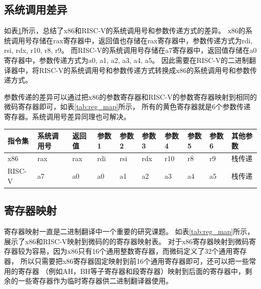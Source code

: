 \subsection{系统调用差异}

如表\ref{tab:syscall}所示，总结了x86和RISC-V的系统调用号和参数传递方式的差异。
x86的系统调用号存储在rax寄存器中，返回值也存储在rax寄存器中，参数传递方式为rdi, rsi, rdx, r10, r8, r9。
而RISC-V的系统调用号存储在a7寄存器中，返回值存储在a0寄存器中，参数传递方式为a0, a1, a2, a3, a4, a5。
因此需要在RISC-V的二进制翻译器中，将RISC-V的系统调用号和参数传递方式转换成x86的系统调用号和参数传递方式。

参数传递的差异可以通过把x86的参数寄存器和RISC-V的参数寄存器映射到相同的微码寄存器即可，如表\ref{tab:reg_map}所示，
所有的黄色寄存器就是6个参数传递寄存器。系统调用号差异同理也可解决。



\begin{table}[h]
    \centering
    \footnotesize%
    \setlength{\tabcolsep}{4pt}%
    \renewcommand{\arraystretch}{1.2}%
      \begin{tabular}{llllllllll}
      \hline
      指令集 & 系统调用号 & 返回值 & 参数1 & 参数2 & 参数3 & 参数4 & 参数5 & 参数6 & 其他参数 \\ \hline
      x86     & rax    & rax   & rdi & rsi & rdx & r10 & r8  & r9  & 栈传递  \\
      RISC-V  & a7     & a0    & a0  & a1  & a2  & a3  & a4  & a5  & 栈传递 \\
      \hline
      \end{tabular}
    \label{tab:syscall}
  \end{table}
  

\subsection{寄存器映射}

寄存器映射一直是二进制翻译中一个重要的研究课题。
如表\ref{tab:reg_map}所示，展示了x86和RISC-V映射到微码的的寄存器映射表。
对于x86寄存器映射到微码寄存器较为容易，因为x86只有16个通用整数寄存器，而微码定义了32个通用寄存器，
所以只需要把x86寄存器固定映射到前16个通用寄存器即可，还可以把一些常用的寄存器
（例如AH，BH等子寄存器和段寄存器）映射到后面的寄存器中，剩余的一些寄存器作为临时寄存器供二进制翻译器使用。

